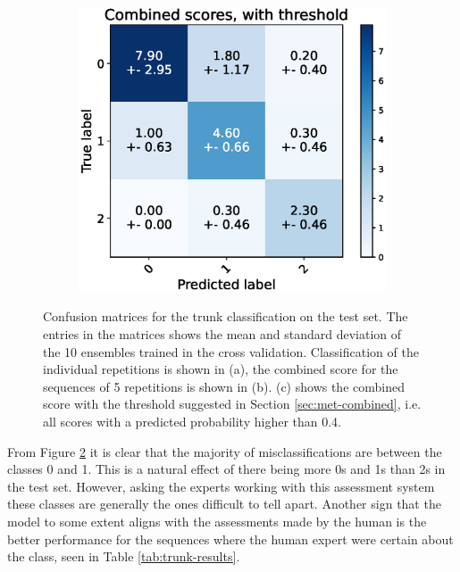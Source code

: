 \begin{figure}
  \begin{subfigure}[t]{0.48\textwidth}
      \includegraphics[width=\textwidth]{files/figs/res/trunk/cnf-combined-th.eps}
      \caption{}
      \label{fig:trunk-cnf-comb-th}
  \end{subfigure}
  \caption{Confusion matrices for the trunk classification on the test set. The entries in the matrices shows the mean and standard deviation of the 10 ensembles trained in the cross validation. Classification of the individual repetitions is shown in (a), the combined score for the sequences of 5 repetitions is shown in (b). (c) shows the combined score with the threshold suggested in Section \ref{sec:met-combined}, i.e. all scores with a predicted probability higher than 0.4.}
  \label{fig:trunk-cnfs}
\end{figure}

From Figure \ref{fig:trunk-cnfs} it is clear that the majority of misclassifications are between the classes 0 and 1. This is a natural effect of there being more 0s and 1s than 2s in the test set. However, asking the experts working with this assessment system these classes are generally the ones difficult to tell apart. Another sign that the model to some extent aligns with the assessments made by the human is the better performance for the sequences where the human expert were certain about the class, seen in Table \ref{tab:trunk-results}.

